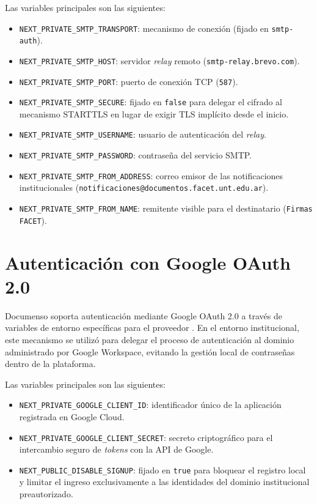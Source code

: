 Las variables principales son las siguientes:

\begin{itemize}
    \item \texttt{NEXT\_PRIVATE\_SMTP\_TRANSPORT}: mecanismo de conexión (fijado en \texttt{smtp-auth}).
    \item \texttt{NEXT\_PRIVATE\_SMTP\_HOST}: servidor \textit{relay} remoto (\texttt{smtp-relay.brevo.com}).
    \item \texttt{NEXT\_PRIVATE\_SMTP\_PORT}: puerto de conexión TCP (\texttt{587}).
    \item \texttt{NEXT\_\allowbreak PRIVATE\_\allowbreak SMTP\_\allowbreak SECURE}: fijado en \texttt{false} para delegar el cifrado al mecanismo STARTTLS en lugar de exigir TLS implícito desde el inicio.
    \item \texttt{NEXT\_PRIVATE\_SMTP\_USERNAME}: usuario de autenticación del \textit{relay}.
    \item \texttt{NEXT\_PRIVATE\_SMTP\_PASSWORD}: contraseña del servicio SMTP.
    \item \texttt{NEXT\_PRIVATE\_SMTP\_FROM\_ADDRESS}: correo emisor de las notificaciones institucionales (\nolinkurl{notificaciones@documentos.facet.unt.edu.ar}).
    \item \texttt{NEXT\_PRIVATE\_SMTP\_FROM\_NAME}: remitente visible para el destinatario (\texttt{Firmas FACET}).
\end{itemize}

\section{Autenticación con Google OAuth 2.0}
\label{AppendixB:GoogleOAuth}

Documenso soporta autenticación mediante Google OAuth 2.0 a través de variables de entorno específicas para el proveedor \cite{documenso_google_oauth}. En el entorno institucional, este mecanismo se utilizó para delegar el proceso de autenticación al dominio administrado por Google Workspace, evitando la gestión local de contraseñas dentro de la plataforma.

Las variables principales son las siguientes:

\begin{itemize}
    \item \texttt{NEXT\_PRIVATE\_GOOGLE\_CLIENT\_ID}: identificador único de la aplicación registrada en Google Cloud.
    \item \texttt{NEXT\_PRIVATE\_GOOGLE\_CLIENT\_SECRET}: secreto criptográfico para el intercambio seguro de \textit{tokens} con la API de Google.
    \item \texttt{NEXT\_PUBLIC\_DISABLE\_SIGNUP}: fijado en \texttt{true} para bloquear el registro local y limitar el ingreso exclusivamente a las identidades del dominio institucional preautorizado.
\end{itemize}

